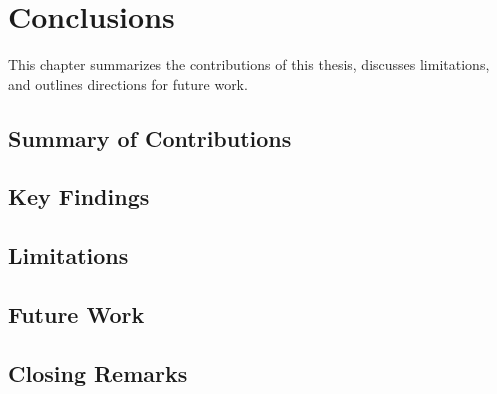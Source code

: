 \chapter{Conclusions}

This chapter summarizes the contributions of this thesis, discusses limitations, and outlines directions for future work.

\section{Summary of Contributions}


\section{Key Findings}


\section{Limitations}


\section{Future Work}


\section{Closing Remarks}

